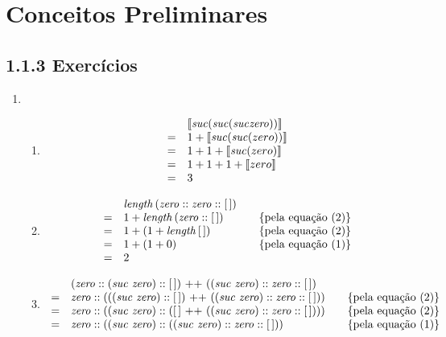 \section{Conceitos Preliminares}

\subsection{1.1.3 Exerc\'icios}

	\begin{enumerate}
	  \item

	  \begin{enumerate}
	    \item
	    \[
	    \begin{array}{ll}
	    & \llbracket \textit{suc\/} (\textit{suc\/} (\textit{suc\/} \textit{zero\/})) \rrbracket\\
	    = & 1 + \llbracket \textit{suc\/} (\textit{suc\/} (zero)) \rrbracket \\
	    = & 1 + 1 + \llbracket \textit{suc\/} (zero) \rrbracket \\
	    = & 1 + 1 + 1 + \llbracket zero \rrbracket \\
            = & 3
	    \end{array}
	    \]

	    \item
	    \[
	    \begin{array}{llcl}
	    & \length\,(\zero ::\zero :: [\,])& & \\
	    = &1 + \length \,(\zero :: [\,]) & & \{\text{pela equa\c{c}\~ao }(2)\}\\
	    = & 1 + (1 + \length \,[\,])  & & \{\text{pela equa\c{c}\~ao }(2)\}\\
	    = &1 + (1 + 0) & & \{\text{pela equa\c{c}\~ao }(1)\}\\
	    = &2
	    \end{array}
	    \]

	    \item
	    \[
	    \begin{array}{llcl}
	    & (\zero :: (\suc\,\,\zero) :: [\,]) \text{ ++ } ((\suc\,\,\zero) :: \zero :: [\,]) & & \\
	    = & \zero :: (((\suc\,\,\zero) :: [\,]) \text{ ++ } ((\suc\,\,\zero) :: \zero::[\,])) & & \{\text{pela equa\c{c}\~ao }(2)\}\\
	    = & \zero :: ((\suc\,\,\zero) :: ( [\,] \text{ ++ } ((\suc\,\,\zero) :: \zero::[\,]))) & & \{\text{pela equa\c{c}\~ao }(2)\}\\
	    = & \zero :: ((\suc\,\,\zero) :: ((\suc\,\,\zero) :: \zero::[\,])) & & \{\text{pela equa\c{c}\~ao }(1)\}\\
	    \end{array}
	    \]
	  \end{enumerate}


\end{enumerate}
